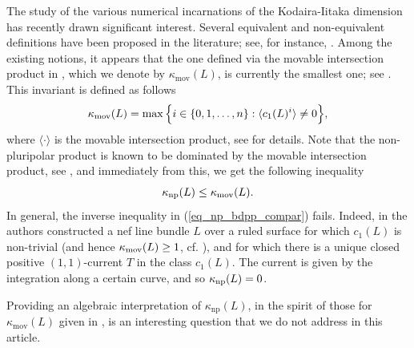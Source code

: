 \documentclass[12pt]{article}
\numberwithin{equation}{section}
\theoremstyle{theorem}
\theoremstyle{definition}
\theoremstyle{remark}
\newcommand{\ban}{\operatorname{Ban}}
\begin{document}
	\begin{sloppypar} 
	The study of the various numerical incarnations of the Kodaira-Iitaka dimension has recently drawn significant interest.
	Several equivalent and non-equivalent definitions have been proposed in the literature; see, for instance, \cite{NakayamaZariski, BDPP, LehmannIitaka, LesieutreIitaka, ChoiParknumII, FLTVolume}.
	Among the existing notions, it appears that the one defined via the movable intersection product in \cite{BDPP}, which we denote by $\kappa_{\mathrm{mov}}(L)$, is currently the smallest one; see \cite[Theorem 1.1 and after]{ChoiParknumII}.
	This invariant is defined as follows
	\begin{equation}
		\kappa_{{\rm{mov}}}(L) = \max\Big\{
			i \in \{ 0, 1, \ldots, n \} :  \langle c_1(L)^{i} \rangle \neq 0
		\Big\},
	\end{equation}
	where $\langle \cdot \rangle$ is the movable intersection product, see \cite[Definition 3.6]{BDPP} for details.
	Note that the non-pluripolar product is known to be dominated by the movable intersection product, see \cite[Proposition 1.20]{BEGZ}, and immediately from this, we get the following inequality
	\begin{equation}\label{eq_np_bdpp_compar}
		\kappa_{{\rm{np}}}(L) \leq  \kappa_{{\rm{mov}}}(L).
	\end{equation}
	In general, the inverse inequality in (\ref{eq_np_bdpp_compar}) fails. 
	Indeed, in \cite[Example 1.7]{DPSNef} the authors constructed a nef line bundle $L$ over a ruled surface for which $c_1(L)$ is non-trivial (and hence $\kappa_{{\rm{mov}}}(L) \geq 1$, cf. \cite[p. 219]{BEGZ}), and for which there is a unique closed positive $(1, 1)$-current $T$ in the class $c_1(L)$. 
	The current is given by the integration along a certain curve, and so $\kappa_{{\rm{np}}}(L) = 0$.
	\par 
	Providing an algebraic interpretation of $\kappa_{\mathrm{np}}(L)$, in the spirit of those for $\kappa_{\mathrm{mov}}(L)$ given in \cite{LehmannIitaka}, is an interesting question that we do not address in this article.
	\end{sloppypar} 
\end{document}
